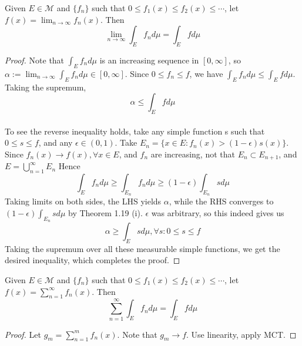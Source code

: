 \documentclass[11pt]{scrartcl}
\begin{document}
\begin{theorem}
Given $E\in \mathcal{M}$ and $\{f_n\}$ such that $0 \leq f_1(x) \leq f_2(x) \leq \cdots$, let $f(x) = \lim_{n\rightarrow \infty} f_n(x)$. Then 
$$\lim_{n\rightarrow \infty} \int_E f_n d\mu = \int_E f d\mu$$
\end{theorem}

\begin{proof}
Note that $\int_E f_n d\mu$ is an increasing sequence in $[0,\infty]$, so $\alpha := \lim_{n\rightarrow \infty} \int_E f_n d\mu \in [0,\infty]$.
Since $0 \leq f_n \leq f$, we have $\int_E f_n d\mu \leq \int_E f d\mu$. Taking the supremum, $$\alpha \leq \int_E f d\mu$$ \\ 
To see the reverse inequality holds, take any simple function s such that $0 \leq s \leq f$, and any $\epsilon \in (0,1)$. Take $E_n = \{x\in E: f_n(x) > (1 - \epsilon)s(x)\}$. Since $f_n(x) \rightarrow f(x), \forall x\in E$, and $f_n$ are increasing, not that $E_n\subset E_{n+1}$, and $E = \bigcup_{n =1}^\infty E_n$
Hence
$$ \int_E f_n d\mu \geq \int_{E_n} f_n d\mu \geq (1 - \epsilon) \int_{E_n} s d\mu$$
Taking limits on both sides, the LHS yields $\alpha$, while the RHS converges to $(1 - \epsilon) \int_{E_n} s d\mu$ by Theorem 1.19 (i). $\epsilon$ was arbitrary, so this indeed gives us $$\alpha \geq \int_E s d\mu, \forall s: 0 \leq s \leq f$$ 
Taking the supremum over all these measurable simple functions, we get the desired inequality, which completes the proof.
\end{proof}

\begin{corollary}
Given $E\in \mathcal{M}$ and $\{f_n\}$ such that $0 \leq f_1(x) \leq f_2(x) \leq \cdots$, let $f(x) = \sum_{n = 1}^{\infty} f_n(x)$. Then 
$$\sum_{n = 1}^{\infty} \int_E f_n d\mu = \int_E f d\mu$$
\end{corollary}

\begin{proof}
Let $g_m = \sum_{n = 1}^{m} f_n(x)$. Note that $g_m \rightarrow f$. Use linearity, apply MCT.
\end{proof}
\end{document}
